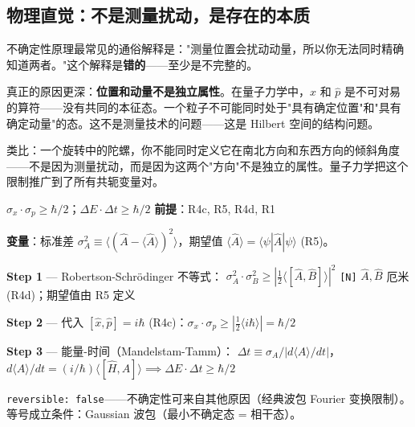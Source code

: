 \subsection{物理直觉：不是测量扰动，是存在的本质}

不确定性原理最常见的通俗解释是："测量位置会扰动动量，所以你无法同时精确知道两者。"这个解释是\textbf{错的}——至少是不完整的。

真正的原因更深：\textbf{位置和动量不是独立属性}。在量子力学中，$\hat{x}$ 和 $\hat{p}$ 是不可对易的算符——没有共同的本征态。一个粒子不可能同时处于"具有确定位置"和"具有确定动量"的态。这不是测量技术的问题——这是 Hilbert 空间的结构问题。

类比：一个旋转中的陀螺，你不能同时定义它在南北方向和东西方向的倾斜角度——不是因为测量扰动，而是因为这两个"方向"不是独立的属性。量子力学把这个限制推广到了所有共轭变量对。


\begin{lawbox}[不确定性原理]
  $\sigma_x \cdot \sigma_p \ge \hbar/2$；$\Delta E \cdot \Delta t \ge \hbar/2$
  \quad\textbf{前提}：R4c, R5, R4d, R1
\end{lawbox}

\noindent\textbf{变量}：标准差 $\sigma_A^2 \equiv \langle(\hat{A}-\langle\hat{A}\rangle)^2\rangle$，期望值 $\langle\hat{A}\rangle = \langle\psi|\hat{A}|\psi\rangle$ (R5)。

\begin{derivationbox}[推导]
  \textbf{Step 1} — Robertson-Schr\"{o}dinger 不等式：
  $\sigma_A^2\cdot\sigma_B^2 \ge |\frac{1}{2}\langle[\hat{A},\hat{B}]\rangle|^2$
  \hfill\texttt{[N]} $\hat{A},\hat{B}$ 厄米 (R4d)；期望值由 R5 定义

  \textbf{Step 2} — 代入 $[\hat{x},\hat{p}] = i\hbar$ (R4c)：$\sigma_x\cdot\sigma_p \ge |\frac{1}{2}\langle i\hbar\rangle| = \hbar/2$

  \textbf{Step 3} — 能量-时间（Mandelstam-Tamm）：
  $\Delta t \equiv \sigma_A/|d\langle A\rangle/dt|$，$d\langle A\rangle/dt = (i/\hbar)\langle[\hat{H},A]\rangle \implies \Delta E\cdot\Delta t \ge \hbar/2$
\end{derivationbox}

\texttt{reversible: false}——不确定性可来自其他原因（经典波包 Fourier 变换限制）。等号成立条件：Gaussian 波包（最小不确定态 = 相干态）。


